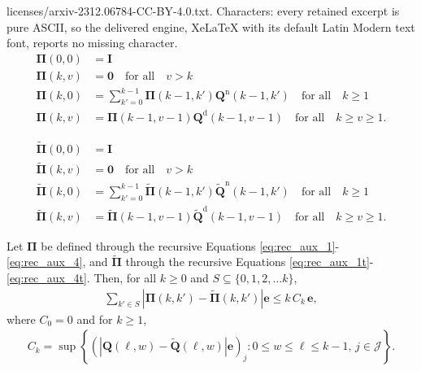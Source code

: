 \documentclass[10pt,a4paper]{amsart}
\newcommand{\tld}[1]{\widetilde{#1}}
\begin{document}
licenses/arxiv-2312.06784-CC-BY-4.0.txt. Characters: every retained excerpt is pure ASCII, so the delivered engine, XeLaTeX with its default Latin Modern text font, reports no missing character.
\begin{align}
\bm{\Pi}(0,0)&=\bm{I}\label{eq:rec_aux_1}\\
\bm{\Pi}(k,v)&=\bm{0}\quad\mbox{for all}\quad v>k\label{eq:rec_aux_2}\\
\bm{\Pi}(k,0)& = \sum_{k'=0}^{k-1}  \bm{\Pi}(k-1,k')\bm{Q}^{\mathrm{n}}(k-1,k')\quad\mbox{for all}\quad k\ge 1\label{eq:rec_aux_3}\\
\bm{\Pi}(k,v)& = \bm{\Pi}(k-1,v-1)\bm{Q}^{\mathrm{d}}(k-1,v-1)\quad\mbox{for all}\quad k\ge v\ge 1.\label{eq:rec_aux_4}
\end{align}

\begin{align}
\tld{\bm{\Pi}}(0,0)&=\bm{I}\label{eq:rec_aux_1t}\\
\tld{\bm{\Pi}}(k,v)&=\bm{0}\quad\mbox{for all}\quad v>k\label{eq:rec_aux_2t}\\
\tld{\bm{\Pi}}(k,0)& = \sum_{k'=0}^{k-1}  \tld{\bm{\Pi}}(k-1,k')\tld{\bm{Q}}^{\mathrm{n}}(k-1,k')\quad\mbox{for all}\quad k\ge 1\label{eq:rec_aux_3t}\\
\tld{\bm{\Pi}}(k,v)& = \tld{\bm{\Pi}}(k-1,v-1)\tld{\bm{Q}}^{\mathrm{d}}(k-1,v-1)\quad\mbox{for all}\quad k\ge v\ge 1.\label{eq:rec_aux_4t}
\end{align}

\begin{lemma}\label{lem:boundPi}
Let $\bm{\Pi}$ be defined through the recursive Equations \ref{eq:rec_aux_1}-\ref{eq:rec_aux_4}, and $\tld{\bm{\Pi}}$  through the recursive Equations \ref{eq:rec_aux_1t}-\ref{eq:rec_aux_4t}. Then, for all $k\ge 0$ and $S\subseteq \{0,1,2,\dots k\}$,
\begin{align}
\sum_{k'\in S} \left|{\bm{\Pi}}(k,k')-\tld{\bm{\Pi}}(k,k')\right|\bm{e}\le k\,C_k\,\bm{e},\label{eq:QtildeQ}
\end{align}
where $C_0=0$ and for $k\ge 1$,
\begin{align}
C_k=\sup\left\{\left(\left|\bm{Q}(\ell,w)-\tld{\bm{Q}}(\ell,w)\right|\bm{e}\right)_j: 0\le w\le \ell\le k-1,\,j\in\mathcal{J}\right\}.\label{eq:defCk}
\end{align}
\end{lemma}
\end{document}
